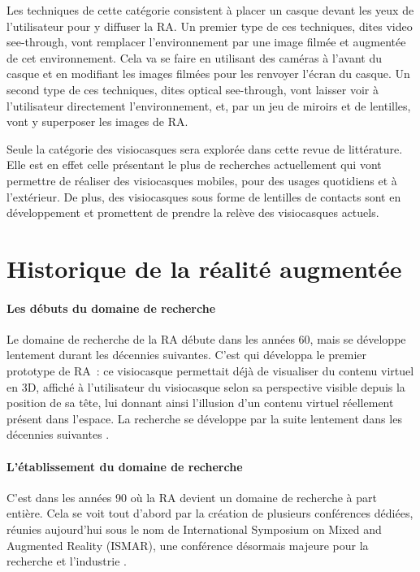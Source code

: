 
Les techniques de cette catégorie consistent à placer un casque devant les yeux de l'utilisateur pour y diffuser la RA. Un premier type de ces techniques, dites \foreignlanguage{english}{video see-through}, vont remplacer l'environnement par une image filmée et augmentée de cet environnement. Cela va se faire en utilisant des caméras à l'avant du casque et en modifiant les images filmées pour les renvoyer l'écran du casque. Un second type de ces techniques, dites \foreignlanguage{english}{optical see-through}, vont laisser voir à l'utilisateur directement l'environnement, et, par un jeu de miroirs et de lentilles, vont y superposer les images de RA.

Seule la catégorie des visiocasques sera explorée dans cette revue de littérature. Elle est en effet celle présentant le plus de recherches actuellement qui vont permettre de réaliser des visiocasques mobiles, pour des usages quotidiens et à l'extérieur. \cite{CarmignianiFurhtAnisettiEtAl2011} De plus, des visiocasques sous forme de lentilles de contacts sont en développement et promettent de prendre la relève des visiocasques actuels. \citep{VanKrevelenPoelman2010}

\section*{Historique de la réalité augmentée}
\paragraph*{Les débuts du domaine de recherche}
Le domaine de recherche de la RA débute dans les années 60, mais se développe lentement durant les décennies suivantes. C'est \citet{Sutherland1968} qui développa le premier prototype de RA~: ce visiocasque permettait déjà de visualiser du contenu virtuel en 3D, affiché à l'utilisateur du visiocasque selon sa perspective visible depuis la position de sa tête, lui donnant ainsi l'illusion d'un contenu virtuel réellement présent dans l'espace. La recherche se développe par la suite lentement dans les décennies suivantes \citep{VanKrevelenPoelman2010} \citep{CarmignianiFurhtAnisettiEtAl2011}.

\paragraph*{L'établissement du domaine de recherche}
C'est dans les années 90 où la RA devient un domaine de recherche à part entière. Cela se voit tout d'abord par la création de plusieurs conférences dédiées, réunies aujourd'hui sous le nom de International Symposium on Mixed and Augmented Reality (ISMAR), une conférence désormais majeure pour la recherche et l'industrie \citep{AzumaBaillotBehringerEtAl2001}.

